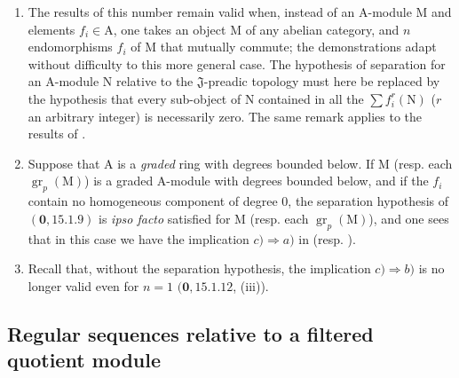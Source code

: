 \begin{remarks}[19.5.6]
\label{IV.19.5.6}
\medskip\noindent
\begin{enumerate}
\item[\rm(i)] The results of this number remain valid when, instead of an $\mathrm{A}$-module $\mathrm{M}$ and elements $f_i\in\mathrm{A}$, one takes an object $\mathrm{M}$ of any abelian category, and $n$ endomorphisms $f_i$ of $\mathrm{M}$ that mutually commute; the demonstrations adapt without difficulty to this more general case. The hypothesis of separation for an $\mathrm{A}$-module $\mathrm{N}$ relative to the $\mathfrak{J}$-preadic topology must here be replaced by the hypothesis that every sub-object of $\mathrm{N}$ contained in all the $\sum f_i^r(\mathrm{N})$ ($r$ an arbitrary integer) is necessarily zero. The same remark applies to the results of .
\item[\rm(ii)] Suppose that $\mathrm{A}$ is a \emph{graded} ring with degrees bounded below. If $\mathrm{M}$ (resp. each $\operatorname{gr}_p(\mathrm{M})$) is a graded $\mathrm{A}$-module with degrees bounded below, and if the $f_i$ contain no homogeneous component of degree $0$, the separation hypothesis of $(\mathbf{0},15.1.9)$ is \emph{ipso facto} satisfied for $\mathrm{M}$ (resp. each $\operatorname{gr}_p(\mathrm{M})$), and one sees that in this case we have the implication $c)\Rightarrow a)$ in  (resp. ).
\item[\rm(iii)] Recall that, without the separation hypothesis, the implication $c)\Rightarrow b)$ is no longer valid even for $n=1$ $(\mathbf{0},15.1.12$, (iii)).
\end{enumerate}
\end{remarks}

\subsection{Regular sequences relative to a filtered quotient module}
\label{subsection:IV.19.6}

